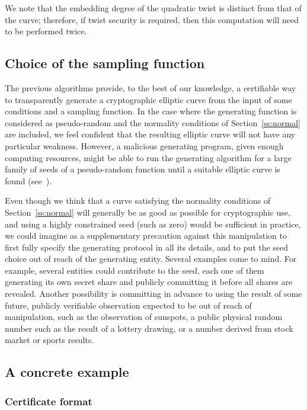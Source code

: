 \documentclass[twocolumn,letterpaper,10pt]{article}
\begin{document}
We note that the embedding degree of the quadratic twist
is distinct from that of the curve;
therefore, if twist security is required,
then this computation will need to be performed twice.

\subsection{Choice of the sampling function}

The previous algorithms provide, to the best of our knowledge,
a certifiable way to transparently generate a cryptographic elliptic curve
from the input of some conditions and a sampling function.
In the case where the generating function is considered as pseudo-random
and the normality conditions of Section~\ref{ss:normal} are included,
we feel confident that the resulting elliptic curve
will not have any particular weakness.
However, a malicious generating program, given enough computing resources,
might be able to run the generating algorithm
for a large family of seeds of a pseudo-random function
until a suitable elliptic curve is found (see~\cite{badass}).

Even though we think that a curve satisfying the normality conditions
of Section~\ref{ss:normal} will generally be as good as possible
for cryptographic use,
and using a highly constrained seed (such as zero)
would be sufficient in practice,
we could imagine as a supplementary precaution against this manipulation
to first fully specify the generating protocol in all its details,
and to put the seed choice out of reach of the generating entity.
Several examples come to mind.
For example, several entities could contribute to the seed,
each one of them generating its own secret share
and publicly committing it before all shares are revealed.
Another possibility is committing in advance to using
the result of some future, publicly verifiable observation
expected to be out of reach of manipulation,
such as the observation of sunspots,
a public physical random number such as the result of a lottery drawing,
or a number derived from stock market or sports results.

\subsection{A concrete example}

\subsubsection{Certificate format}
\end{document}
